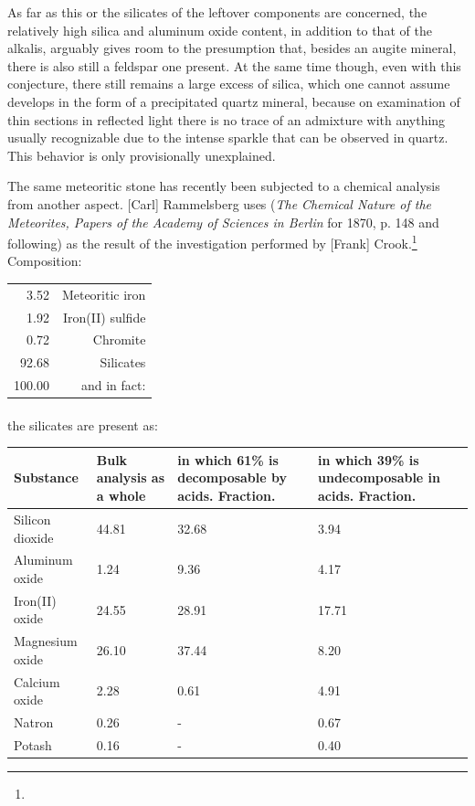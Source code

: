 \documentclass[a4paper, 12pt, oneside]{article}
\begin{document}
As far as this or the silicates of the leftover components are concerned, the relatively high silica and aluminum oxide content, in addition to that of the alkalis, arguably gives room to the presumption that, besides an augite mineral, there is also still a feldspar one present. At the same time though, even with this conjecture, there still remains a large excess of silica, which one cannot assume develops in the form of a precipitated quartz mineral, because on examination of thin sections in reflected light there is no trace of an admixture with anything usually recognizable due to the intense sparkle that can be observed in quartz. This behavior is only provisionally unexplained.

The same meteoritic stone has recently been subjected to a chemical analysis from another aspect. [Carl] Rammelsberg uses (\emph{The Chemical Nature of the Meteorites, Papers of the Academy of Sciences in Berlin} for 1870, p. 148 and following) as the result of the investigation performed by [Frank] Crook.\footnote{} Composition:
\begin{center}
    \begin{tabular}{r r}
        3.52 & Meteoritic iron\\
        1.92 & Iron(II) sulfide\\
        0.72 & Chromite\\
        92.68 & Silicates\\
        100.00 & and in fact:\\
    \end{tabular}
\end{center}
\paragraph*{}
the silicates are present as:
\begin{center}
    \begin{tabular}{ |l|p{1.5cm}|p{3.2cm}|p{2.9cm}| }
        \hline
        Substance & Bulk analysis as a whole & in which 61\% is decomposable by acids. Fraction. & in which 39\% is undecomposable in acids. Fraction.\\\hline
        Silicon dioxide & 44.81 & 32.68 & 3.94\\\hline
        Aluminum oxide & 1.24 & 9.36 & 4.17\\\hline
        Iron(II) oxide & 24.55 & 28.91 & 17.71\\\hline
        Magnesium oxide & 26.10 & 37.44 & 8.20\\\hline
        Calcium oxide & 2.28 & 0.61 & 4.91\\\hline
        Natron & 0.26 & - & 0.67\\\hline
        Potash & 0.16 & - & 0.40\\
        \hline
    \end{tabular}
\end{center}
\end{document}

